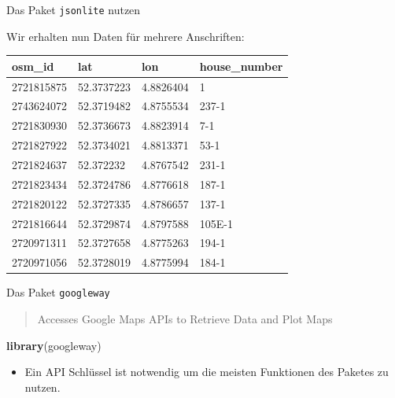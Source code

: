\documentclass[ignorenonframetext,]{beamer}
\newenvironment{Shaded}{\begin{snugshade}}{\end{snugshade}}
\newcommand{\KeywordTok}[1]{\textcolor[rgb]{0.26,0.66,0.93}{\textbf{#1}}}
\newcommand{\NormalTok}[1]{\textcolor[rgb]{0.74,0.68,0.62}{#1}}
\newcommand{\OperatorTok}[1]{\textcolor[rgb]{0.74,0.68,0.62}{#1}}
\newcommand{\StringTok}[1]{\textcolor[rgb]{0.02,0.61,0.04}{#1}}
\providecommand{\tightlist}{%
  \setlength{\itemsep}{0pt}\setlength{\parskip}{0pt}}
\begin{document}
\begin{frame}[fragile]{Das Paket \texttt{jsonlite} nutzen}
\protect\hypertarget{das-paket-jsonlite-nutzen}{}

\begin{Shaded}
\end{Shaded}

Wir erhalten nun Daten für mehrere Anschriften:

\begin{longtable}[]{@{}llll@{}}
\toprule
osm\_id & lat & lon & house\_number\tabularnewline
\midrule
\endhead
2721815875 & 52.3737223 & 4.8826404 & 1\tabularnewline
2743624072 & 52.3719482 & 4.8755534 & 237-1\tabularnewline
2721830930 & 52.3736673 & 4.8823914 & 7-1\tabularnewline
2721827922 & 52.3734021 & 4.8813371 & 53-1\tabularnewline
2721824637 & 52.372232 & 4.8767542 & 231-1\tabularnewline
2721823434 & 52.3724786 & 4.8776618 & 187-1\tabularnewline
2721820122 & 52.3727335 & 4.8786657 & 137-1\tabularnewline
2721816644 & 52.3729874 & 4.8797588 & 105E-1\tabularnewline
2720971311 & 52.3727658 & 4.8775263 & 194-1\tabularnewline
2720971056 & 52.3728019 & 4.8775994 & 184-1\tabularnewline
\bottomrule
\end{longtable}

\end{frame}

\begin{frame}[fragile]{Das Paket \texttt{googleway}}
\protect\hypertarget{das-paket-googleway}{}

\begin{quote}
Accesses Google Maps APIs to Retrieve Data and Plot Maps
\end{quote}

\begin{Shaded}
\begin{Highlighting}[]
\KeywordTok{library}\NormalTok{(googleway)}
\end{Highlighting}
\end{Shaded}

\begin{itemize}
\tightlist
\item
  Ein API Schlüssel ist notwendig um die meisten Funktionen des Paketes
  zu nutzen.
\end{itemize}

\end{frame}
\end{document}
